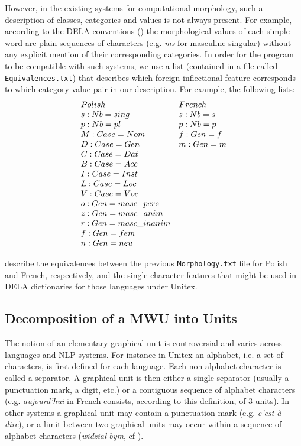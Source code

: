 \bigskip
\noindent However, in the existing systems for computational morphology, such a
description of classes, categories and values is not always present. For example, according to the DELA 
conventions (\cite{dicos-francais}) the morphological values of each simple word are plain 
sequences of characters (e.g. \emph{ms} for masculine singular) without any explicit mention 
of their corresponding categories. In order for the program to be compatible
with such systems, we use a list (contained in a file
called
\verb+Equivalences.txt+) that describes which foreign inflectional feature
corresponds to which category-value pair in our description. For example, the following lists:
\[
\begin{array}[c]{ll}
Polish                        &French\\
s: Nb=sing                    &s: Nb=s  \\
p: Nb=pl                      &p: Nb=p \\
M: Case=Nom                   &f: Gen=f  \\
D: Case=Gen                   &m: Gen=m    \\
C: Case=Dat  &\\
B: Case=Acc  &\\
I: Case=Inst  &\\
L: Case=Loc  &\\
V: Case=Voc  &\\
o: Gen=masc\_pers  &\\
z: Gen=masc\_anim  &\\
r: Gen=masc\_inanim  &\\
f: Gen=fem  &\\
n: Gen=neu &
\end{array}
\]

\bigskip
\noindent describe the equivalences between the previous \verb+Morphology.txt+
file for Polish and French, respectively, and the single-character features that might be used in 
DELA dictionaries for those languages under Unitex.

\subsection{Decomposition of a MWU into Units}
\label{subsec:decomp}
The notion of an elementary graphical unit is controversial and varies across languages 
and NLP systems. For instance in Unitex an alphabet, i.e. a set of characters, is
first defined for each language. Each non alphabet character is called a separator. A graphical 
unit is then either a single separator (usually a punctuation mark, a digit, etc.) or a 
contiguous sequence of alphabet characters (e.g. \emph{aujourd'hui} in French consists, 
according to this definition, of 3 units). In other systems a graphical unit may contain 
a punctuation mark (e.g. \emph{c'est-\`a-dire}), or a limit between two graphical units 
may occur within a sequence of alphabet characters (\emph{widzia\l $\mid$bym}, cf \cite{PrzepWol03}). 


